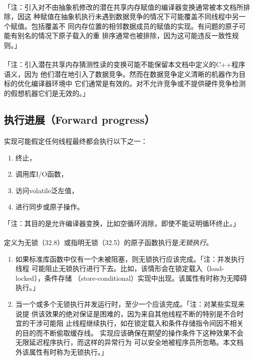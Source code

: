 \paragraph{}
「注：引入对不由抽象机修改的潜在共享内存赋值的编译器变换通常被本文档所排除，因这
种赋值在抽象机执行未遇到数据竞争的情况下可能覆盖不同线程中另一个赋值。包括覆盖不
同内存位置的相邻数据成员的赋值的实现。有问题的原子可能有别名的情况下原子载入的重
排序通常也被排除，因为这可能违反一致性规则。」

\paragraph{}
「注：引入潜在共享内存猜测性读的变换可能不能保留本文档中定义的C++程序语义，因为
他们潜在地引入了数据竞争。然而在数据竞争定义清晰的机器作为目标的优化编译器环境中
它们通常是有效的。对不允许竞争或不提供硬件竞争检测的假想机器它们是无效的。」

\subsection{执行进展（Forward progress）}
\paragraph{}
实现可能假定任何线程最终都会执行以下之一：
\begin{enumerate}
  \item{终止，}
  \item{调用库I/O函数，}
  \item{访问volatile泛左值，}
  \item{进行同步或原子操作。}
\end{enumerate}
「注：其目的是允许编译器变换，比如空循环消除，即使不能证明循环终止。」

\paragraph{}
定义为无锁（32.8）或指明无锁（32.5）的原子函数执行是\textit{无锁执行}。
\begin{enumerate}
  \item{如果标准库函数中仅有一个未被阻塞，则无锁执行应该完成。「注：并发执行线程
    可能阻止无锁执行进行下去。比如，该情形会在锁定载入（load-locked），条件存储
    （store-conditional）实现中出现。该属性有时称为无障碍执行。」}
  \item{当一个或多个无锁执行并发运行时，至少一个应该完成。「注：对某些实现来说提
    供该效果的绝对保证是困难的，因为来自其他线程不断的特别是不合时宜的干涉可能阻
    止线程继续执行，如在锁定载入和条件存储指令间因不相关的目的而不断偷取缓存线。
    实现应该确保在期望的操作条件下这种效果不会无限延迟程序执行，而这样的异常行为
    可以安全地被程序员所忽略。本文档外该属性有时称为无锁执行。」}
\end{enumerate}

